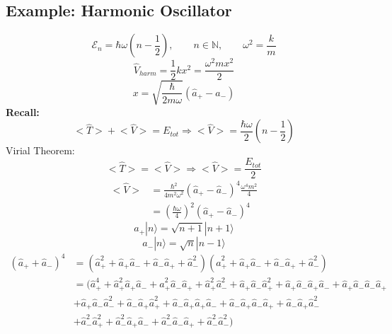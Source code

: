 \documentclass[12pt,fancychapters]{report}
\numberwithin{equation}{section}
\begin{document}
\subsection*{Example: Harmonic Oscillator}
\[
  \mathcal{E}_n = \hbar\omega\left(n - \frac{1}{2}\right), \qquad n \in \mathbb{N}, \qquad
  \omega^2 = \frac{k}{m}
\]
\[
  \hat{V}_{harm} = \frac{1}{2}kx^2 = \frac{\omega^2 m x^2}{2}
\]
\[
  x = \sqrt{\frac{\hbar}{2m\omega}}\left(\hat{a}_+ - \hat{a}_-\right)
\]
\textbf{Recall:}
\[
  \big<\hat{T}\big> + \big<\hat{V}\big> = E_{tot} \Rightarrow \big<\hat{V}\big> = 
  \frac{\hbar\omega}{2}\left(n - \frac{1}{2}\right)
\]
Virial Theorem:
\[
  \big<\hat{T}\big> = \big< \hat{V}\big> \Rightarrow \big<\hat{V}\big> = \frac{E_{tot}}{2}
\]
\begin{align*}
  \big<\hat{V}\big> &= \frac{\hbar^2}{4m^2\omega^2}\left(\hat{a}_+ - \hat{a}_-\right)^4
  \frac{\omega^4m^2}{4}\\
                    &= \left(\frac{\hbar\omega}{4}\right)^2 \left(\hat{a}_+ - \hat{a}_-\right)^4
\end{align*}
\[
  a_+|n\rangle=\sqrt{n+1}|n+1\rangle
\]
\[
a_-|n\rangle=\sqrt{n}|n-1\rangle 
\]
\begin{align*}
  \left(\hat{a}_{+} + \hat{a}_{-}\right)^4 &=\left(\hat{a}_{+}^2+\hat{a}_{+}\hat{a}_{-} 
    + \hat{a}_{-}
    \hat{a}_{+} + \hat{a}_{-}^2\right)\left(\hat{a}_{+}^2+\hat{a}_{+}\hat{a}_{-} 
    +\hat{a}_{-}\hat{a}_{+} + \hat{a}_{-}^2\right)\\
  &=\big(\hat{a}_{+}^4+\hat{a}_{+}^2\hat{a}_{+}\hat{a}_{-}+\hat{a}_{+}^2\hat{a}_{-}\hat{a}_{+} +
    \hat{a}_{+}^2\hat{a}_{-}^2+\hat{a}_{+}\hat{a}_{-}\hat{a}_{+}^2 + \hat{a}_{+}\hat{a}_{-}
    \hat{a}_{+}
    \hat{a}_{-} + \hat{a}_{+}\hat{a}_{-}\hat{a}_{-}\hat{a}_{+}\\
  &+\hat{a}_{+}\hat{a}_{-}\hat{a}_{-}^2 + \hat{a}_{-}\hat{a}_{+}\hat{a}_{+}^2 + 
  \hat{a}_{-}\hat{a}_{+}
  \hat{a}_{+}\hat{a}_{-} + \hat{a}_{-} \hat{a}_{+}\hat{a}_{-}\hat{a}_{+} 
  + \hat{a}_{-}\hat{a}_{+}\hat{a}_{-}^2\\
&+\hat{a}_{-}^2 \hat{a}_{+}^2 + \hat{a}_{-}^2\hat{a}_{+}\hat{a}_{-} + \hat{a}_{-}^2
\hat{a}_{-}\hat{a}_{+} + \hat{a}_{-}^2\hat{a}_{-}^2\big)
\end{align*}
\end{document}
